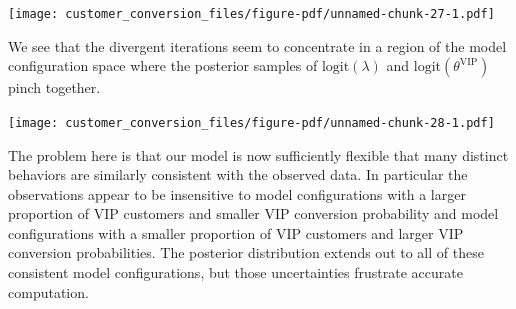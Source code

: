 \documentclass[
  letterpaper,
  DIV=11,
  numbers=noendperiod]{scrartcl}
\newenvironment{Shaded}{\begin{snugshade}}{\end{snugshade}}
\newcommand{\AttributeTok}[1]{\textcolor[rgb]{0.40,0.45,0.13}{#1}}
\newcommand{\DecValTok}[1]{\textcolor[rgb]{0.68,0.00,0.00}{#1}}
\newcommand{\FunctionTok}[1]{\textcolor[rgb]{0.28,0.35,0.67}{#1}}
\newcommand{\NormalTok}[1]{\textcolor[rgb]{0.00,0.23,0.31}{#1}}
\newcommand{\OtherTok}[1]{\textcolor[rgb]{0.00,0.23,0.31}{#1}}
\newcommand{\SpecialCharTok}[1]{\textcolor[rgb]{0.37,0.37,0.37}{#1}}
\newcommand{\StringTok}[1]{\textcolor[rgb]{0.13,0.47,0.30}{#1}}
\begin{document}
\begin{Shaded}
\end{Shaded}

\texttt{[image: customer\_conversion\_files/figure-pdf/unnamed-chunk-27-1.pdf]}

We see that the divergent iterations seem to concentrate in a region of
the model configuration space where the posterior samples of
\(\mathrm{logit}(\lambda)\) and \(\mathrm{logit}(\theta^{\text{VIP}})\)
pinch together.

\begin{Shaded}
\end{Shaded}

\texttt{[image: customer\_conversion\_files/figure-pdf/unnamed-chunk-28-1.pdf]}

The problem here is that our model is now sufficiently flexible that
many distinct behaviors are similarly consistent with the observed data.
In particular the observations appear to be insensitive to model
configurations with a larger proportion of VIP customers and smaller VIP
conversion probability and model configurations with a smaller
proportion of VIP customers and larger VIP conversion probabilities. The
posterior distribution extends out to all of these consistent model
configurations, but those uncertainties frustrate accurate computation.
\end{document}
